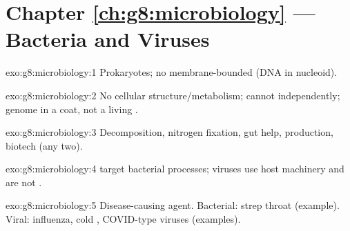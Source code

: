 \section*{Chapter \ref{ch:g8:microbiology} --- Bacteria and Viruses}

\begin{solution}{exo:g8:microbiology:1}
Prokaryotes; no membrane-bounded  (DNA in nucleoid).
\end{solution}

\begin{solution}{exo:g8:microbiology:2}
No cellular structure/metabolism; cannot  independently; genome
in a coat, not a living .
\end{solution}

\begin{solution}{exo:g8:microbiology:3}
Decomposition, nitrogen fixation, gut help,  production, biotech (any
two).
\end{solution}

\begin{solution}{exo:g8:microbiology:4}
 target bacterial processes; viruses use host  machinery
and are not .
\end{solution}

\begin{solution}{exo:g8:microbiology:5}
Disease-causing agent. Bacterial: strep throat  (example).
Viral: influenza, cold , COVID-type viruses (examples).
\end{solution}

